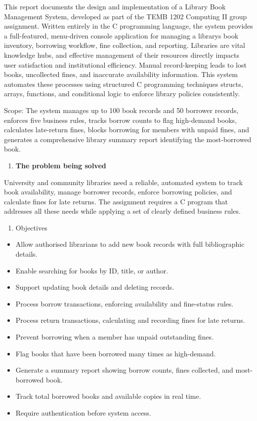 \documentclass[
]{article}
\begin{document}
This report documents the design and implementation of a Library Book
Management System, developed as part of the TEMB 1202 Computing II group
assignment. Written entirely in the C programming language, the system
provides a full-featured, menu-driven console application for managing a
library\textquotesingle s book inventory, borrowing workflow, fine
collection, and reporting. Libraries are vital knowledge hubs, and
effective management of their resources directly impacts user
satisfaction and institutional efficiency. Manual record-keeping leads
to lost books, uncollected fines, and inaccurate availability
information. This system automates these processes using structured C
programming techniques structs, arrays, functions, and conditional logic
to enforce library policies consistently.

Scope: The system manages up to 100 book records and 50 borrower
records, enforces five business rules, tracks borrow counts to flag
high-demand books, calculates late-return fines, blocks borrowing for
members with unpaid fines, and generates a comprehensive library summary
report identifying the most-borrowed book.

\begin{enumerate}
\def\labelenumi{\arabic{enumi}.}
\setcounter{enumi}{1}
\item
  \textbf{The problem being solved}
\end{enumerate}

University and community libraries need a reliable, automated system to
track book availability, manage borrower records, enforce borrowing
policies, and calculate fines for late returns. The assignment requires
a C program that addresses all these needs while applying a set of
clearly defined business rules.

\begin{enumerate}
\def\labelenumi{\alph{enumi})}
\item
  Objectives
\end{enumerate}

\begin{itemize}
\item
  Allow authorised librarians to add new book records with full
  bibliographic details.
\item
  Enable searching for books by ID, title, or author.
\item
  Support updating book details and deleting records.
\item
  Process borrow transactions, enforcing availability and fine-status
  rules.
\item
  Process return transactions, calculating and recording fines for late
  returns.
\item
  Prevent borrowing when a member has unpaid outstanding fines.
\item
  Flag books that have been borrowed many times as high-demand.
\item
  Generate a summary report showing borrow counts, fines collected, and
  most-borrowed book.
\item
  Track total borrowed books and available copies in real time.
\item
  Require authentication before system access.
\end{itemize}
\end{document}
